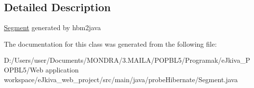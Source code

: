 \subsection{Detailed Description}
\mbox{\hyperlink{classprobe_hibernate_1_1_segment}{Segment}} generated by hbm2java 

The documentation for this class was generated from the following file\+:\begin{DoxyCompactItemize}
\item 
D\+:/\+Users/user/\+Documents/\+M\+O\+N\+D\+R\+A/3.\+M\+A\+I\+L\+A/\+P\+O\+P\+B\+L5/\+Programak/e\+Jkiva\+\_\+\+P\+O\+P\+B\+L5/\+Web application workspace/e\+Jkiva\+\_\+web\+\_\+project/src/main/java/probe\+Hibernate/Segment.\+java\end{DoxyCompactItemize}
